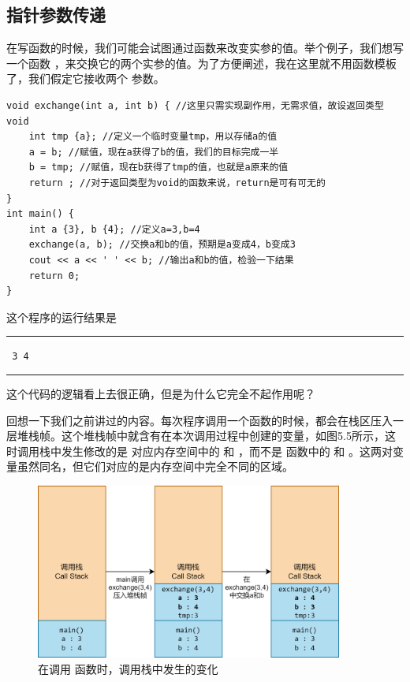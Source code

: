 \subsection*{指针参数传递}
在写函数的时候，我们可能会试图通过函数来改变实参的值。举个例子，我们想写一个函数 \lstinline@exchange@，来交换它的两个实参的值。为了方便阐述，我在这里就不用函数模板了，我们假定它接收两个 \lstinline@int@ 参数。
\begin{lstlisting}
void exchange(int a, int b) { //这里只需实现副作用，无需求值，故设返回类型void
    int tmp {a}; //定义一个临时变量tmp，用以存储a的值
    a = b; //赋值，现在a获得了b的值，我们的目标完成一半
    b = tmp; //赋值，现在b获得了tmp的值，也就是a原来的值
    return ; //对于返回类型为void的函数来说，return是可有可无的
}
int main() {
    int a {3}, b {4}; //定义a=3,b=4
    exchange(a, b); //交换a和b的值，预期是a变成4，b变成3
    cout << a << ' ' << b; //输出a和b的值，检验一下结果
    return 0;
}
\end{lstlisting}
这个程序的运行结果是\\\noindent\rule{\linewidth}{0.2pt}\texttt{
3 4
}\\\noindent\rule{\linewidth}{0.2pt}
这个代码的逻辑看上去很正确，但是为什么它完全不起作用呢？\par
回想一下我们之前讲过的内容。每次程序调用一个函数的时候，都会在栈区压入一层堆栈帧。这个堆栈帧中就含有在本次调用过程中创建的变量，如图5.5所示，这时调用栈中发生修改的是 \lstinline@exchange@ 对应内存空间中的 \lstinline@a@ 和 \lstinline@b@，而不是 \lstinline@main@ 函数中的 \lstinline@a@ 和 \lstinline@b@。这两对变量虽然同名，但它们对应的是内存空间中完全不同的区域。\par
\begin{figure}[htbp]
    \centering
    \includegraphics[width=0.9\textwidth]{../images/generalized_parts/05_parameter_pass_by_value.drawio.png}
    \caption{在调用 \lstinline@exchange@ 函数时，调用栈中发生的变化}
\end{figure}
